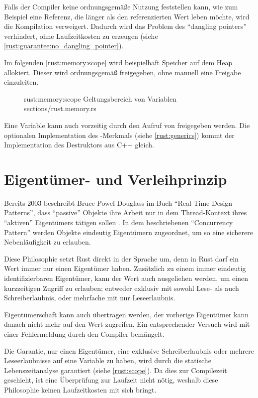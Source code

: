 Falls der Compiler keine ordnungsgemäße Nutzung feststellen kann, wie zum Beispiel eine Referenz, die länger als den referenzierten Wert leben möchte, wird die Kompilation verweigert.
Dadurch wird das Problem des \enquote{dangling pointers} verhindert, ohne Laufzeitkosten zu erzeugen (siehe \autoref{rust:guarantee:no_dangling_pointer}).

Im folgenden \autoref{rust:memory:scope} wird beispielhaft Speicher auf dem Heap allokiert.
Dieser wird ordnungsgemäß freigegeben, ohne manuell eine Freigabe einzuleiten.

\begin{figure}[H]
	\rustcinclude
		{rust:memory:scope}
		{Geltungsbereich von Variablen}
		{sections/rust.memory.rs}
\end{figure}

Eine Variable kann auch vorzeitig durch den Aufruf von  freigegeben werden.
Die optionalen Implementation des -Merkmals (siehe \autoref{rust:generics}) kommt der Implementation des Destruktors aus C++ gleich.

\section{Eigentümer- und Verleihprinzip}
\label{rust:ownership}

Bereits 2003 beschreibt Bruce Powel Douglass im Buch \enquote{Real-Time Design Patterns}, dass \enquote{passive} Objekte ihre Arbeit nur in dem Thread-Kontext ihres \enquote{aktiven} Eigentümers tätigen sollen \cite[204]{douglass2003real}.
In dem beschriebenen \enquote{Concurrency Pattern} werden Objekte eindeutig Eigentümern zugeordnet, um so eine sicherere Nebenläufigkeit zu erlauben.

Diese Philosophie setzt Rust direkt in der Sprache um, denn in Rust darf ein Wert immer nur einen Eigentümer haben.
Zusätzlich zu einem immer eindeutig identifizierbaren Eigentümer, kann der Wert auch ausgeliehen werden, um einen kurzzeitigen Zugriff zu erlauben; entweder exklusiv mit sowohl Lese- als auch Schreiberlaubnis, oder mehrfache mit nur Leseerlaubnis.

Eigentümerschaft kann auch übertragen werden, der vorherige Eigentümer kann danach nicht mehr auf den Wert zugreifen.
Ein entsprechender Versuch wird mit einer Fehlermeldung durch den Compiler bemängelt.

Die Garantie, nur einen Eigentümer, eine exklusive Schreiberlaubnis oder mehrere Leseerlaubnisse auf eine Variable zu haben, wird durch die statische Lebenszeitanalyse garantiert (siehe \autoref{rust:scope}).
Da dies zur Compilezeit geschieht, ist eine Überprüfung zur Laufzeit nicht nötig, weshalb diese Philosophie keinen Laufzeitkosten mit sich bringt.

